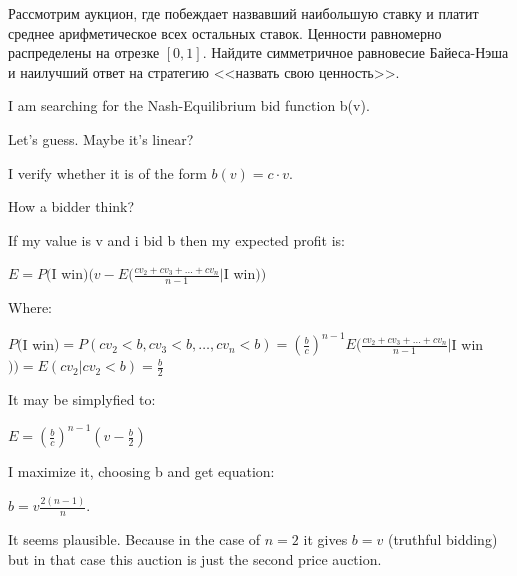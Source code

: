 \begin{problem}

Рассмотрим аукцион, где побеждает назвавший наибольшую ставку и платит среднее арифметическое всех остальных ставок. Ценности равномерно распределены на отрезке $[0,1]$. Найдите симметричное равновесие Байеса-Нэша и наилучший ответ на стратегию <<назвать свою ценность>>.

\begin{sol}

I am searching for the Nash-Equilibrium bid function b(v).

Let's guess. Maybe it's linear? \par
I verify whether it is of the form $b(v) = c\cdot v$. \par
How a bidder think? \par

If my value is v and i bid b then my expected profit is:\par
$E = P($I win$)(v - E(\frac {cv_{2} + cv_{3} + \ldots + cv_{n}}{n - 1}|$I win$))$ \par
Where:\par
$P($I win$)=P(cv_{2} < b,cv_{3} < b,\ldots,cv_{n} < b)=\left(\frac {b}{c}\right)^{n - 1}
E(\frac {cv_{2} + cv_{3} + \ldots + cv_{n}}{n - 1}|$I win$))=E(cv_{2}|cv_{2}<b)=\frac{b}{2}$\par
It may be simplyfied to:\par
$E = \left(\frac {b}{c}\right)^{n - 1}(v - \frac {b}{2})$\par
I maximize it, choosing b and get equation: \par
$b = v\frac {2(n - 1)}{n}$. \par

It seems plausible. Because in the case of $n = 2$ it gives $b = v$ (truthful bidding) but in that case this auction is just the second price auction.
\end{sol}
\end{problem}




